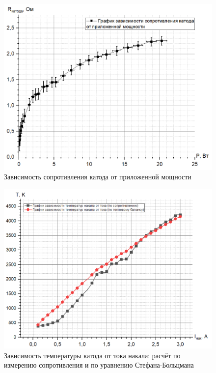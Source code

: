 \documentclass[a4paper]{article}
\begin{document}
\begin{figure}[h]
\begin{center}
\includegraphics[width=13cm]{fig2.png}
\caption{Зависимость сопротивления катода от приложенной мощности}
\end{center}
\end{figure}

\begin{figure}[h]
\begin{center}
\includegraphics[width=13cm]{fig3.png}
\caption{Зависимость температуры катода от тока накала: расчёт по измерению сопротивления и по уравнению Стефана-Больцмана}
\end{center}
\end{figure}
\end{document}
